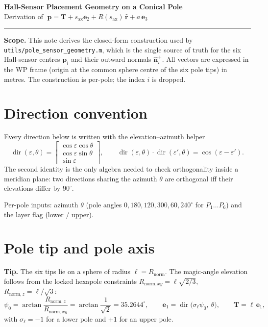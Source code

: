 \documentclass[12pt]{article}
\newcommand{\ehat}[1]{\mathbf{e}_{#1}}
\newcommand{\rhat}{\hat{\mathbf{r}}}
\newcommand{\nhat}{\hat{\mathbf{n}}}
\newcommand{\dir}{\operatorname{dir}}
\begin{document}
\begin{center}
\large\textbf{Hall-Sensor Placement Geometry on a Conical Pole}\\[2pt]
\normalsize Derivation of $\;\mathbf{p}=\mathbf{T}+s_{\mathrm{ax}}\ehat{2}+R(s_{\mathrm{ax}})\,\rhat+a\,\ehat{3}$
\end{center}

\vspace{2pt}
\hrule
\vspace{8pt}

\textbf{Scope.} This note derives the closed-form construction used by
\texttt{utils/pole\_sensor\_geometry.m}, which is the single source of truth for the
six Hall-sensor centres $\mathbf{p}_i$ and their outward normals $\nhat_i^{+}$.
All vectors are expressed in the WP frame (origin at the common sphere centre of the
six pole tips) in metres. The construction is per-pole; the index $i$ is dropped.

\section{Direction convention}

Every direction below is written with the elevation--azimuth helper
\begin{equation}
\dir(\varepsilon,\theta)=
\begin{bmatrix}\cos\varepsilon\cos\theta\\ \cos\varepsilon\sin\theta\\ \sin\varepsilon\end{bmatrix},
\qquad
\dir(\varepsilon,\theta)\cdot\dir(\varepsilon',\theta)=\cos(\varepsilon-\varepsilon').
\label{eq:dir}
\end{equation}
The second identity is the only algebra needed to check orthogonality inside a
meridian plane: two directions sharing the azimuth $\theta$ are orthogonal iff their
elevations differ by $90^\circ$.

Per-pole inputs: azimuth $\theta$ (pole angles $0,180,120,300,60,240^\circ$ for
$P_1\ldots P_6$) and the layer flag (lower / upper).

\section{Pole tip and pole axis}

\textbf{Tip.} The six tips lie on a sphere of radius $\ell=R_{\mathrm{norm}}$. The
magic-angle elevation follows from the locked hexapole constraints
$R_{\mathrm{norm},xy}=\ell\sqrt{2/3}$, $R_{\mathrm{norm},z}=\ell/\sqrt{3}$:
\begin{equation}
\psi_0=\arctan\!\frac{R_{\mathrm{norm},z}}{R_{\mathrm{norm},xy}}
      =\arctan\frac{1}{\sqrt2}=35.2644^\circ ,
\qquad
\ehat{1}=\dir\!\big(\sigma_\ell\psi_0,\ \theta\big),\qquad
\mathbf{T}=\ell\,\ehat{1},
\label{eq:tip}
\end{equation}
with $\sigma_\ell=-1$ for a lower pole and $+1$ for an upper pole.
\end{document}
